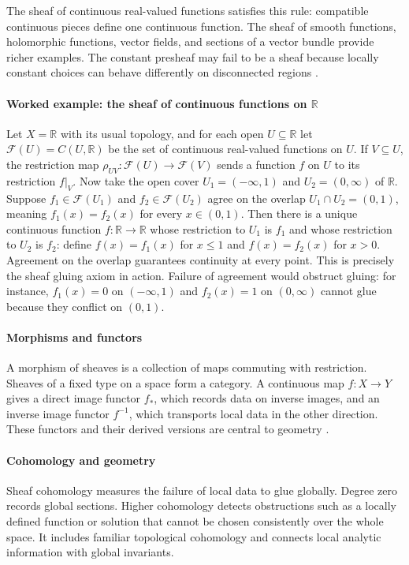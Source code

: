 The sheaf of continuous real-valued functions satisfies this rule: compatible continuous pieces define one continuous function. The sheaf of smooth functions, holomorphic functions, vector fields, and sections of a vector bundle provide richer examples. The constant presheaf may fail to be a sheaf because locally constant choices can behave differently on disconnected regions \cite{sheaf_ref1}.

\paragraph{Worked example: the sheaf of continuous functions on $\mathbb R$}
Let $X=\mathbb R$ with its usual topology, and for each open $U\subseteq\mathbb R$ let $\mathcal F(U)=C(U,\mathbb R)$ be the set of continuous real-valued functions on $U$. If $V\subseteq U$, the restriction map $\rho_{UV}\colon\mathcal F(U)\to\mathcal F(V)$ sends a function $f$ on $U$ to its restriction $f\big|_V$. Now take the open cover $U_1=(-\infty,1)$ and $U_2=(0,\infty)$ of $\mathbb R$. Suppose $f_1\in\mathcal F(U_1)$ and $f_2\in\mathcal F(U_2)$ agree on the overlap $U_1\cap U_2=(0,1)$, meaning $f_1(x)=f_2(x)$ for every $x\in(0,1)$. Then there is a unique continuous function $f\colon\mathbb R\to\mathbb R$ whose restriction to $U_1$ is $f_1$ and whose restriction to $U_2$ is $f_2$: define $f(x)=f_1(x)$ for $x\le1$ and $f(x)=f_2(x)$ for $x>0$. Agreement on the overlap guarantees continuity at every point. This is precisely the sheaf gluing axiom in action. Failure of agreement would obstruct gluing: for instance, $f_1(x)=0$ on $(-\infty,1)$ and $f_2(x)=1$ on $(0,\infty)$ cannot glue because they conflict on $(0,1)$.

\paragraph{Morphisms and functors}
A morphism of sheaves is a collection of maps commuting with restriction. Sheaves of a fixed type on a space form a category. A continuous map $f:X\to Y$ gives a direct image functor $f_*$, which records data on inverse images, and an inverse image functor $f^{-1}$, which transports local data in the other direction. These functors and their derived versions are central to geometry \cite{sheaf_ref3}.

\paragraph{Cohomology and geometry}
Sheaf cohomology measures the failure of local data to glue globally. Degree zero records global sections. Higher cohomology detects obstructions such as a locally defined function or solution that cannot be chosen consistently over the whole space. It includes familiar topological cohomology and connects local analytic information with global invariants.


